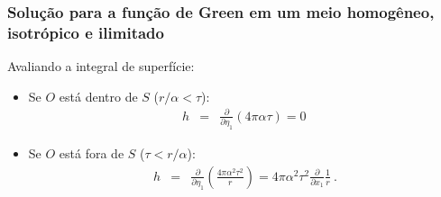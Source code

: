 \documentclass{beamer}
\begin{document}
\begin{frame}
	\frametitle{\textbf{Solu\c{c}\~ao para a fun\c{c}\~ao de Green em um meio homog\^eneo, isotr\'opico e ilimitado}}
	\begin{flushleft}
		\textcolor{red!60!black}{Avaliando a integral de superf\'icie:}
	\end{flushleft}
	
	\begin{itemize}
		\item Se $O$ est\'a dentro de $S$ ($ r/\alpha < \tau $):
		\begin{eqnarray}
		\label{ten1}
		h &=& \frac{\partial}{\partial \eta_1} \left(  4\pi \alpha \tau \right) = 0\, 
		\end{eqnarray}
		\item Se $O$ est\'a fora de $S$ ($  \tau < r/\alpha $):
		\begin{eqnarray}
		\label{ten1}
		h &=& \frac{\partial}{\partial \eta_1} \left(  \frac{4\pi \alpha^2 \tau^2}{r} \right) =  4\pi \alpha^2 \tau^2 \frac{\partial}{\partial x_1} \frac{1}{r}\ .   
		\end{eqnarray}
	\end{itemize}
	
\end{frame}%
\end{document}
